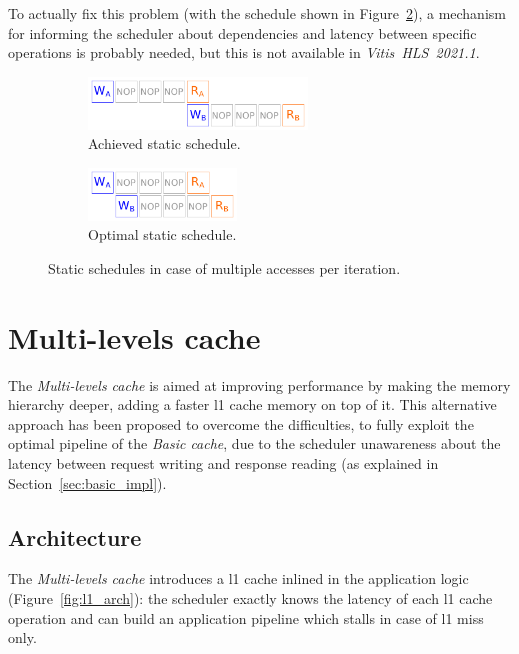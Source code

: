 \documentclass[11pt,a4paper,oneside]{memoir}
\begin{document}
\bigskip
To actually fix this problem (with the schedule shown in
Figure~\ref{subfig:fixed_sched_desired}), a mechanism for informing the
scheduler about dependencies and latency between specific operations is
probably needed, but this is not available in
\emph{Vitis\texttrademark~HLS~2021.1}.

\begin{figure}[!htb]
	\centering
	\begin{subfigure}[b]{.4\textwidth}
		\centering
		\includegraphics[height=1.4cm]{fixed_schedule_issue}
		\caption{Achieved static schedule.}
		\label{subfig:fixed_sched_issue}
	\end{subfigure}
	\hfill
	\begin{subfigure}[b]{.4\textwidth}
		\centering
		\includegraphics[height=1.4cm]{fixed_schedule_desired}
		\caption{Optimal static schedule.}
		\label{subfig:fixed_sched_desired}
	\end{subfigure}
	\caption{Static schedules in case of multiple accesses per iteration.}
	\label{fig:fixed_sched_issue}
\end{figure}

\chapter{Multi-levels cache}
The \emph{Multi-levels cache} is aimed at improving performance by making the
memory hierarchy deeper, adding a faster \ac{l1} cache memory on top of it.
This alternative approach has been proposed to overcome the difficulties, to
fully exploit the optimal pipeline of the \emph{Basic cache}, due to the
scheduler unawareness about the latency between request writing and response
reading (as explained in Section~\ref{sec:basic_impl}).

\section{Architecture}
The \emph{Multi-levels cache} introduces a \ac{l1} cache inlined in the
application logic (Figure~\ref{fig:l1_arch}): the scheduler exactly knows the
latency of each \ac{l1} cache operation and can build an application pipeline
which stalls in case of \ac{l1} miss only.
\end{document}
